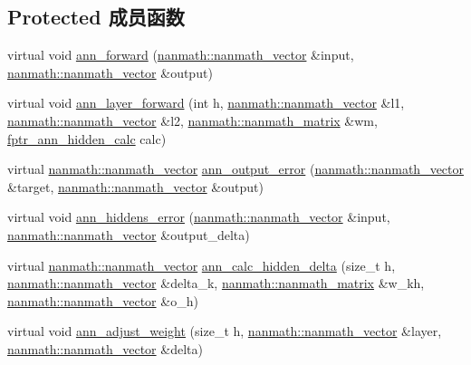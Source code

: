 \subsection*{Protected 成员函数}
\begin{DoxyCompactItemize}
\item 
virtual void \hyperlink{classnanai_1_1nanai__ann__nanncalc_a59b33730cd75893be549ba6cbe1cd7aa}{ann\+\_\+forward} (\hyperlink{classnanmath_1_1nanmath__vector}{nanmath\+::nanmath\+\_\+vector} \&input, \hyperlink{classnanmath_1_1nanmath__vector}{nanmath\+::nanmath\+\_\+vector} \&output)
\item 
virtual void \hyperlink{classnanai_1_1nanai__ann__nanncalc_af70fe54abb55d464459e2ce4548b1ff2}{ann\+\_\+layer\+\_\+forward} (int h, \hyperlink{classnanmath_1_1nanmath__vector}{nanmath\+::nanmath\+\_\+vector} \&l1, \hyperlink{classnanmath_1_1nanmath__vector}{nanmath\+::nanmath\+\_\+vector} \&l2, \hyperlink{classnanmath_1_1nanmath__matrix}{nanmath\+::nanmath\+\_\+matrix} \&wm, \hyperlink{namespacenanai_a299d9093f72831a48d205e94e200690c}{fptr\+\_\+ann\+\_\+hidden\+\_\+calc} calc)
\item 
virtual \hyperlink{classnanmath_1_1nanmath__vector}{nanmath\+::nanmath\+\_\+vector} \hyperlink{classnanai_1_1nanai__ann__nanncalc_a95e7765ed618d5ab2e4f90593f053d89}{ann\+\_\+output\+\_\+error} (\hyperlink{classnanmath_1_1nanmath__vector}{nanmath\+::nanmath\+\_\+vector} \&target, \hyperlink{classnanmath_1_1nanmath__vector}{nanmath\+::nanmath\+\_\+vector} \&output)
\item 
virtual void \hyperlink{classnanai_1_1nanai__ann__nanncalc_a655e79fd2845915c691081094b02e121}{ann\+\_\+hiddens\+\_\+error} (\hyperlink{classnanmath_1_1nanmath__vector}{nanmath\+::nanmath\+\_\+vector} \&input, \hyperlink{classnanmath_1_1nanmath__vector}{nanmath\+::nanmath\+\_\+vector} \&output\+\_\+delta)
\item 
virtual \hyperlink{classnanmath_1_1nanmath__vector}{nanmath\+::nanmath\+\_\+vector} \hyperlink{classnanai_1_1nanai__ann__nanncalc_ac3254f506152da643ce0dd7b3077ff92}{ann\+\_\+calc\+\_\+hidden\+\_\+delta} (size\+\_\+t h, \hyperlink{classnanmath_1_1nanmath__vector}{nanmath\+::nanmath\+\_\+vector} \&delta\+\_\+k, \hyperlink{classnanmath_1_1nanmath__matrix}{nanmath\+::nanmath\+\_\+matrix} \&w\+\_\+kh, \hyperlink{classnanmath_1_1nanmath__vector}{nanmath\+::nanmath\+\_\+vector} \&o\+\_\+h)
\item 
virtual void \hyperlink{classnanai_1_1nanai__ann__nanncalc_a6066093c9c477445b6bc93261608c1b1}{ann\+\_\+adjust\+\_\+weight} (size\+\_\+t h, \hyperlink{classnanmath_1_1nanmath__vector}{nanmath\+::nanmath\+\_\+vector} \&layer, \hyperlink{classnanmath_1_1nanmath__vector}{nanmath\+::nanmath\+\_\+vector} \&delta)

\end{DoxyCompactItemize}
